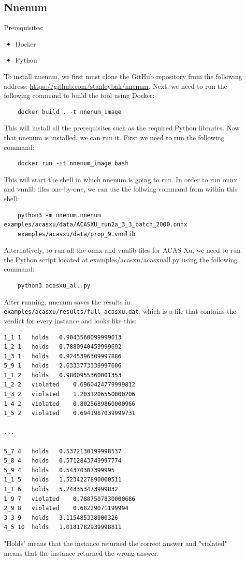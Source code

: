 \documentclass{article}
\begin{document}
\subsection{Nnenum \cite{nnenum}}
Prerequisites: 
\begin{itemize}
    \item Docker
    \item Python
\end{itemize}
To install nnenum, we first must clone the GitHub repository from the following address:  \url{https://github.com/stanleybak/nnenum}.
Next, we need to run the following command to build the tool using Docker:
\begin{verbatim}
    docker build . -t nnenum_image
\end{verbatim}
This will install all the prerequisites such as the required Python libraries.
\newline
Now that nnenum is installed, we can run it. First we need to run the following command:
\begin{verbatim}
    docker run -it nnenum_image bash
\end{verbatim}
This will start the shell in which nnenum is going to run.
\newline
In order to run onnx and vnnlib files one-by-one, we can use the follwing command from within this shell:
\begin{verbatim}
    python3 -m nnenum.nnenum examples/acasxu/data/ACASXU_run2a_3_3_batch_2000.onnx
    examples/acasxu/data/prop_9.vnnlib
\end{verbatim}
Alternatively, to run all the onnx and vnnlib files for ACAS Xu, we need to run the Python script located at examples/acasxu/acasxu\textunderscore all.py using the following command:
\begin{verbatim}
    python3 acasxu_all.py
\end{verbatim}
After running, nnenum saves the results in \verb|examples/acasxu/results/full_acasxu.dat|, which is a file that contains the verdict for every instance and looks like this:
\begin{verbatim}
1_1	1	holds	0.9043560099999013
1_2	1	holds	0.7880940459999692
1_3	1	holds	0.9245396309997886
5_9	1	holds	2.6333773339997606
1_1	2	holds	0.9800955360001353
1_2	2	violated	0.6960424779999812
1_3	2	violated	1.2031206550000206
1_4	2	violated	0.8025689860000966
1_5	2	violated	0.6941987039999731

...

5_7	4	holds	0.5372130199998537
5_8	4	holds	0.5712843749997774
5_9	4	holds	0.54370307399995
1_1	5	holds	1.5234227890000511
1_1	6	holds	5.243353473999832
1_9	7	violated	0.7887507830000686
2_9	8	violated	0.68229071199994
3_3	9	holds	3.115485338000326
4_5	10	holds	1.0181782939998811
\end{verbatim}
"Holds" means that the instance returned the correct answer and "violated" means that the instance returned the wrong answer.
\clearpage
\end{document}
